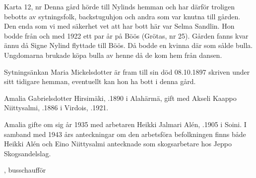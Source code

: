 Karta 12,   nr 
Denna gård hörde till Nylinds hemman och har därför troligen bebotts av sytningsfolk, backstuguhjon och andra som var knutna till gården. Den enda som vi med säkerhet vet att har bott här var Selma Sandlin. Hon bodde från och med 1922 ett par år på Böös (Grötas, nr 25). Gården fanns kvar ännu då Signe Nylind flyttade till Böös. Då bodde en kvinna där som sålde bulla. Ungdomarna brukade köpa bulla av henne då de kom hem från dansen.

Sytningsänkan Maria Mickelsdotter är fram till sin död 08.10.1897 skriven under sitt tidigare hemman, eventuellt kan hon ha bott i denna gård.






Amalia Gabrielsdotter Hirsimäki, .1890 i Alahärmä, gift med Akseli Kaappo Niittysalmi, .1886 i Virdois, .1921.

Amalia gifte om sig år 1935 med arbetaren Heikki Jalmari Alén, .1905 i Soini. I samband med 1943 års anteckningar om den arbetsföra befolkningen finns både Heikki Alén och Eino Niittysalmi antecknade som skogsarbetare hos Jeppo Skogsandelslag.
\begin{jhchildren}
  \item {}
  \item {}
  \item {}, busschaufför
  \item {}
  \item {}
  \item {}
  \item {}
  \item {}
\end{jhchildren}

